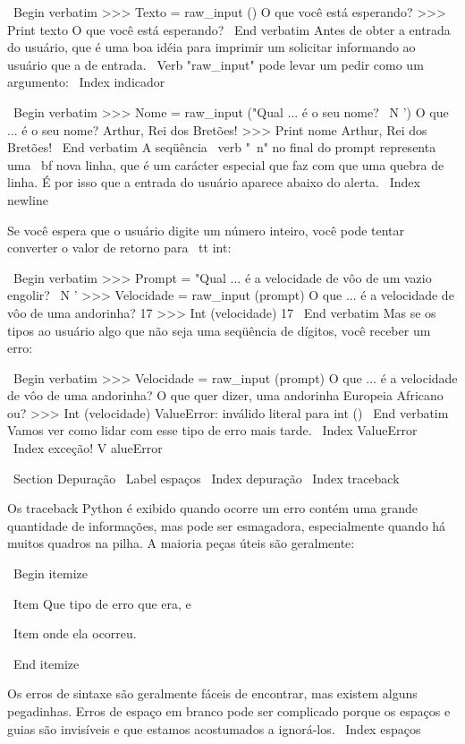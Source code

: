 \documentclass[10pt]{book}
\begin{document}
{{{\ Begin {verbatim}
>>> Texto = raw_input ()
O que você está esperando?
>>> Print texto
O que você está esperando?
\ End {verbatim}
%
Antes de obter a entrada do usuário, que é uma boa idéia para imprimir um
solicitar informando ao usuário que a de entrada. \ Verb "raw_input" pode levar um
pedir como um argumento:
\ Index {indicador}

\ Begin {verbatim}
>>> Nome = raw_input ("Qual ... é o seu nome? \ N ')
O que ... é o seu nome?
Arthur, Rei dos Bretões!
>>> Print nome
Arthur, Rei dos Bretões!
\ End {verbatim}
%
A seqüência \ verb "\ n" no final do prompt representa uma {\ bf nova linha},
que é um carácter especial que faz com que uma quebra de linha.
É por isso que a entrada do usuário aparece abaixo do alerta.
\ Index {newline}

Se você espera que o usuário digite um número inteiro, você pode tentar converter
o valor de retorno para {\ tt int}:

\ Begin {verbatim}
>>> Prompt = "Qual ... é a velocidade de vôo de um vazio engolir? \ N '
>>> Velocidade = raw_input (prompt)
O que ... é a velocidade de vôo de uma andorinha?
17
>>> Int (velocidade)
17
\ End {verbatim}
%
Mas se os tipos ao usuário algo que não seja uma seqüência de dígitos,
você receber um erro:

\ Begin {verbatim}
>>> Velocidade = raw_input (prompt)
O que ... é a velocidade de vôo de uma andorinha?
O que quer dizer, uma andorinha Europeia Africano ou?
>>> Int (velocidade)
ValueError: inválido literal para int ()
\ End {verbatim}
%
Vamos ver como lidar com esse tipo de erro mais tarde.
\ Index {} ValueError
\ Index {exceção! V alueError}


\ Section {} Depuração
\ Label {espaços}
\ Index {depuração}
\ Index {} traceback

Os traceback Python é exibido quando ocorre um erro contém
uma grande quantidade de informações, mas pode ser esmagadora, especialmente
quando há muitos quadros na pilha. A maioria
peças úteis são geralmente:

\ Begin {itemize}

\ Item Que tipo de erro que era, e

\ Item onde ela ocorreu.

\ End {itemize}

Os erros de sintaxe são geralmente fáceis de encontrar, mas existem alguns
pegadinhas. Erros de espaço em branco pode ser complicado porque os espaços e
guias são invisíveis e que estamos acostumados a ignorá-los.
\ Index {espaços}

}}}
\end{document}
